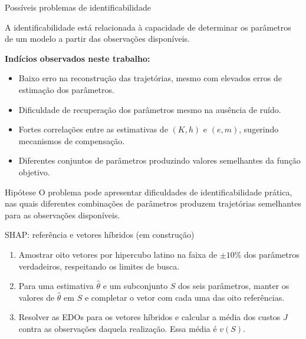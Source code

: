 \begin{frame}{Possíveis problemas de identificabilidade}

  A identificabilidade está relacionada à capacidade de
  determinar os parâmetros de um modelo a partir das
  observações disponíveis.

  \medskip
  \textbf{Indícios observados neste trabalho:}

  \begin{itemize}
    \item Baixo erro na reconstrução das trajetórias, mesmo
          com elevados erros de estimação dos parâmetros.

    \item Dificuldade de recuperação dos parâmetros
          mesmo na ausência de ruído.

    \item Fortes correlações entre as estimativas de
          $(K,h)$ e $(e,m)$, sugerindo mecanismos
          de compensação.

    \item Diferentes conjuntos de parâmetros produzindo
          valores semelhantes da função objetivo.
  \end{itemize}

  \begin{block}{Hipótese}
    O problema pode apresentar dificuldades de
    identificabilidade prática, nas quais diferentes
    combinações de parâmetros produzem trajetórias
    semelhantes para as observações disponíveis.
  \end{block}

\end{frame}

\begin{frame}{SHAP: referência e vetores híbridos (em construção)}
  \begin{enumerate}
    \item Amostrar oito vetores por hipercubo latino na faixa de $\pm10\%$
          dos parâmetros verdadeiros, respeitando os limites de busca.
    \item Para uma estimativa $\hat\theta$ e um subconjunto $S$ dos seis
          parâmetros, manter os valores de $\hat\theta$ em $S$ e completar
          o vetor com cada uma das oito referências.
    \item Resolver as EDOs para os vetores híbridos e calcular a média dos
          custos $J$ contra as observações daquela realização. Essa média
          é $v(S)$.
  \end{enumerate}
\end{frame}

